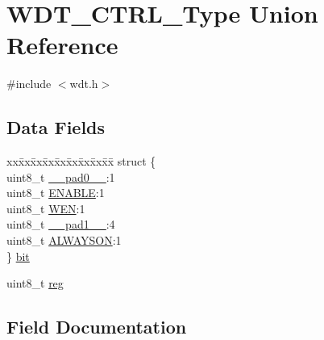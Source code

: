 \hypertarget{union_w_d_t___c_t_r_l___type}{}\section{W\+D\+T\+\_\+\+C\+T\+R\+L\+\_\+\+Type Union Reference}
\label{union_w_d_t___c_t_r_l___type}


{\ttfamily \#include $<$wdt.\+h$>$}

\subsection*{Data Fields}
\begin{DoxyCompactItemize}
\item 
\begin{tabbing}
xx\=xx\=xx\=xx\=xx\=xx\=xx\=xx\=xx\=\kill
struct \{\\
\>uint8\_t \mbox{\hyperlink{union_w_d_t___c_t_r_l___type_a8b4eebe79ded0459acec2f4950102ba3}{\_\_pad0\_\_}}:1\\
\>uint8\_t \mbox{\hyperlink{union_w_d_t___c_t_r_l___type_a2b3662f1b123463ae1a23c1f324e5cc5}{ENABLE}}:1\\
\>uint8\_t \mbox{\hyperlink{union_w_d_t___c_t_r_l___type_ab03c9121a6cce6a348185dadc8c2746d}{WEN}}:1\\
\>uint8\_t \mbox{\hyperlink{union_w_d_t___c_t_r_l___type_a77f12d2e278bd5c07712648ac0df5e08}{\_\_pad1\_\_}}:4\\
\>uint8\_t \mbox{\hyperlink{union_w_d_t___c_t_r_l___type_a1fe385372e480b840a6f130157c43c9f}{ALWAYSON}}:1\\
\} \mbox{\hyperlink{union_w_d_t___c_t_r_l___type_a45c6a92c547fedb85052d854240d006b}{bit}}\\

\end{tabbing}\item 
uint8\+\_\+t \mbox{\hyperlink{union_w_d_t___c_t_r_l___type_a9428adc9af4653a2050e2536b55dec8d}{reg}}
\end{DoxyCompactItemize}


\subsection{Field Documentation}
\mbox{\label{union_w_d_t___c_t_r_l___type_a8b4eebe79ded0459acec2f4950102ba3}} 
